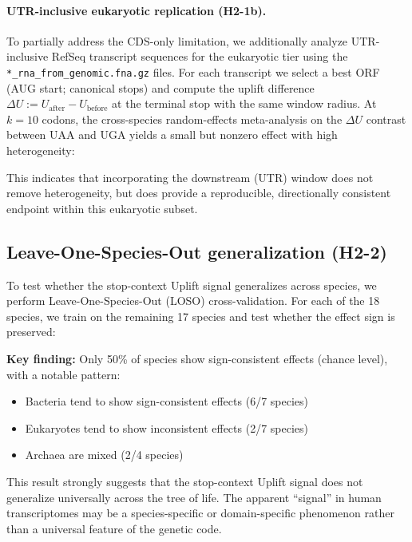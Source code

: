 \paragraph{UTR-inclusive eukaryotic replication (H2-1b).}
To partially address the CDS-only limitation, we additionally analyze UTR-inclusive RefSeq transcript sequences for the eukaryotic tier using the \texttt{*\_rna\_from\_genomic.fna.gz} files.
For each transcript we select a best ORF (AUG start; canonical stops) and compute the uplift difference $\Delta U := U_{\mathrm{after}}-U_{\mathrm{before}}$ at the terminal stop with the same window radius.
At $k=10$ codons, the cross-species random-effects meta-analysis on the $\Delta U$ contrast between $\mathrm{UAA}$ and $\mathrm{UGA}$ yields a small but nonzero effect with high heterogeneity:

This indicates that incorporating the downstream (UTR) window does not remove heterogeneity, but does provide a reproducible, directionally consistent endpoint within this eukaryotic subset.

\subsection{Leave-One-Species-Out generalization (H2-2)}
\label{sec:loso_generalization}

To test whether the stop-context Uplift signal generalizes across species, we perform Leave-One-Species-Out (LOSO) cross-validation.
For each of the 18 species, we train on the remaining 17 species and test whether the effect sign is preserved:


\textbf{Key finding:} Only 50\% of species show sign-consistent effects (chance level), with a notable pattern:
\begin{itemize}
\item Bacteria tend to show sign-consistent effects (6/7 species)
\item Eukaryotes tend to show inconsistent effects (2/7 species)
\item Archaea are mixed (2/4 species)
\end{itemize}

This result strongly suggests that the stop-context Uplift signal does not generalize universally across the tree of life.
The apparent ``signal'' in human transcriptomes may be a species-specific or domain-specific phenomenon rather than a universal feature of the genetic code.

